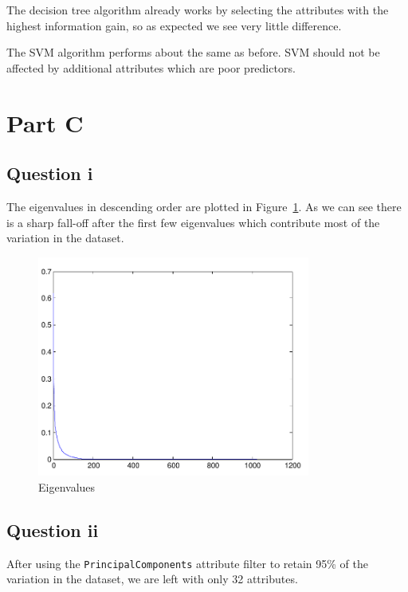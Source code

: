 \documentclass[a4paper]{article}
\begin{document}
The decision tree algorithm already works by selecting the attributes with the highest information gain, so as expected we see very little difference.

The SVM algorithm performs about the same as before. SVM should not be affected by additional attributes which are poor predictors.

\section*{Part C}
\subsection*{Question i}

The eigenvalues in descending order are plotted in Figure~\ref{fig:c1img1}. As we can see there is a sharp fall-off after the first few eigenvalues which contribute most of the variation in the dataset.

\begin{figure}[!htbp]
\centering
\includegraphics[width=0.8\textwidth]{C1-img1-eigenvalues-cropped.pdf}
\caption{Eigenvalues}
\label{fig:c1img1}
\end{figure}

\FloatBarrier

\subsection*{Question ii}

After using the {\tt PrincipalComponents} attribute filter to retain 95\% of the variation in the dataset, we are left with only 32 attributes.
\end{document}
